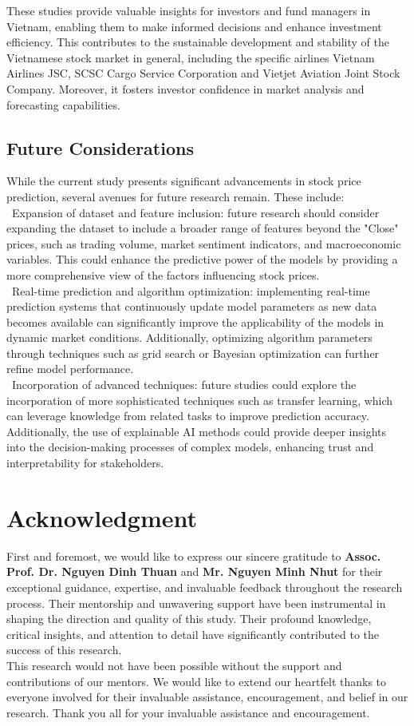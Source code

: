 \documentclass{ieeeojies}
\begin{document}
These studies provide valuable insights for investors and fund managers in Vietnam, enabling them to make informed decisions and enhance investment efficiency. This contributes to the sustainable development and stability of the Vietnamese stock market in general, including the specific airlines Vietnam Airlines JSC, SCSC Cargo Service Corporation and Vietjet Aviation Joint Stock Company. Moreover, it fosters investor confidence in market analysis and forecasting capabilities.

\subsection{Future Considerations}
While the current study presents significant advancements in stock price prediction, several avenues for future research remain. These include:\\
\indent\textbullet\ Expansion of dataset and feature inclusion: future research should consider expanding the dataset to include a broader range of features beyond the "Close" prices, such as trading volume, market sentiment indicators, and macroeconomic variables. This could enhance the predictive power of the models by providing a more comprehensive view of the factors influencing stock prices. \\
\indent\textbullet\ Real-time prediction and algorithm optimization: implementing real-time prediction systems that continuously update model parameters as new data becomes available can significantly improve the applicability of the models in dynamic market conditions. Additionally, optimizing algorithm parameters through techniques such as grid search or Bayesian optimization can further refine model performance. \\
\indent\textbullet\ Incorporation of advanced techniques: future studies could explore the incorporation of more sophisticated techniques such as transfer learning, which can leverage knowledge from related tasks to improve prediction accuracy. Additionally, the use of explainable AI methods could provide deeper insights into the decision-making processes of complex models, enhancing trust and interpretability for stakeholders.

\section*{Acknowledgment}
First and foremost, we would like to express our sincere gratitude to \textbf{Assoc. Prof. Dr. Nguyen Dinh Thuan} and \textbf{Mr. Nguyen Minh Nhut} for their exceptional guidance, expertise, and invaluable feedback throughout the research process. Their mentorship and unwavering support have been instrumental in shaping the direction and quality of this study. Their profound knowledge, critical insights, and attention to detail have significantly contributed to the success of this research.
\\This research would not have been possible without the support and contributions of our mentors. We would like to extend our heartfelt thanks to everyone involved for their invaluable assistance, encouragement, and belief in our research. Thank you all for your invaluable assistance and encouragement.
\end{document}
